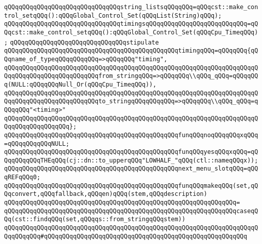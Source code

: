 \verb|qQQqqQQqqQQqqQQqqQQqqQQqqQQqqQQqstring_listsqQQqqQQq=qQQqcst::make_control_setqQQq():qQQqGlobal_Control_Set(qQQqList(String)qQQq);|\newline
\verb|qQQqqQQqqQQqqQQqqQQqqQQqqQQqqQQqtimingsqQQqqQQqqQQqqQQqqQQqqQQqqQQq=qQQqcst::make_control_setqQQq():qQQqGlobal_Control_Set(qQQqCpu_TimeqQQq);|\newline
\newline
\verb|qQQqqQQqqQQqqQQqqQQqqQQqqQQqqQQqstipulate|\newline
\verb|qQQqqQQqqQQqqQQqqQQqqQQqqQQqqQQqqQQqqQQqqQQqqQQqtimingqQQq=qQQqqQQq{qQQqname_of_typeqQQqqQQqqQQq=>qQQqqQQq"timing",|\newline
\verb|qQQqqQQqqQQqqQQqqQQqqQQqqQQqqQQqqQQqqQQqqQQqqQQqqQQqqQQqqQQqqQQqqQQqqQQqqQQqqQQqqQQqqQQqqQQqqQQqfrom_stringqQQq=>qQQqqQQq\\qQQq_qQQq=qQQqqQQq(NULL:qQQqqQQqNull_Or(qQQqCpu_TimeqQQq)),|\newline
\verb|qQQqqQQqqQQqqQQqqQQqqQQqqQQqqQQqqQQqqQQqqQQqqQQqqQQqqQQqqQQqqQQqqQQqqQQqqQQqqQQqqQQqqQQqqQQqqQQqto_stringqQQqqQQqqQQq=>qQQqqQQq\\qQQq_qQQq=qQQqqQQq"<timing>"|\newline
\verb|qQQqqQQqqQQqqQQqqQQqqQQqqQQqqQQqqQQqqQQqqQQqqQQqqQQqqQQqqQQqqQQqqQQqqQQqqQQqqQQqqQQqqQQq};|\newline
\newline
\verb|qQQqqQQqqQQqqQQqqQQqqQQqqQQqqQQqqQQqqQQqqQQqqQQqfunqQQqnoqQQqqQQqxqQQq=qQQqqQQqqQQqNULL;|\newline
\verb|qQQqqQQqqQQqqQQqqQQqqQQqqQQqqQQqqQQqqQQqqQQqqQQqfunqQQqyesqQQqxqQQq=qQQqqQQqqQQqTHEqQQq(cj::dn::to_upperqQQq"LOWHALF_"qQQq(ctl::nameqQQqx));|\newline
\newline
\verb|qQQqqQQqqQQqqQQqqQQqqQQqqQQqqQQqqQQqqQQqqQQqqQQqnext_menu_slotqQQq=qQQqREFqQQq0;|\newline
\newline
\verb|qQQqqQQqqQQqqQQqqQQqqQQqqQQqqQQqqQQqqQQqqQQqqQQqfunqQQqmakeqQQq(set,qQQqconvert,qQQqfallback,qQQqen)qQQq(stem,qQQqdescription)|\newline
\verb|qQQqqQQqqQQqqQQqqQQqqQQqqQQqqQQqqQQqqQQqqQQqqQQqqQQqqQQqqQQqqQQq=|\newline
\verb|qQQqqQQqqQQqqQQqqQQqqQQqqQQqqQQqqQQqqQQqqQQqqQQqqQQqqQQqqQQqqQQqcaseqQQq(cst::findqQQq(set,qQQqqs::from_stringqQQqstem))|\newline
\verb|qQQqqQQqqQQqqQQqqQQqqQQqqQQqqQQqqQQqqQQqqQQqqQQqqQQqqQQqqQQqqQQqqQQqqQQqqQQqqQQq#qQQqqQQqqQQqqQQqqQQqqQQqqQQqqQQqqQQqqQQqqQQqqQQqqQQqqQQq|\newline
